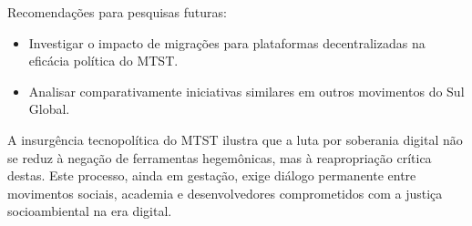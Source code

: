 Recomendações para pesquisas futuras:
    \begin{itemize}
        \item Investigar o impacto de migrações para plataformas decentralizadas na eficácia política do MTST.
        \item Analisar comparativamente iniciativas similares em outros movimentos do Sul Global.
    \end{itemize}

A insurgência tecnopolítica do MTST ilustra que a luta por soberania digital não se reduz à negação de ferramentas hegemônicas, mas à reapropriação crítica destas. Este processo, ainda em gestação, exige diálogo permanente entre movimentos sociais, academia e desenvolvedores comprometidos com a justiça socioambiental na era digital.